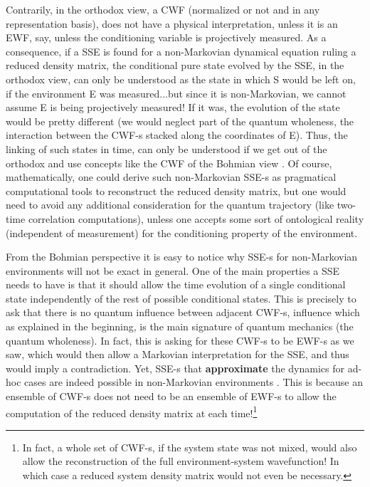 \documentclass[11pt, a4paper]{article} %
\begin{document}
Contrarily, in the orthodox view, a CWF (normalized or not and in any representation basis), does not have a physical interpretation, unless it is an EWF, say, unless the conditioning variable is projectively measured. As a consequence, if a SSE is found for a non-Markovian dynamical equation ruling a reduced density matrix, the conditional pure state evolved by the SSE, in the orthodox view, can only be understood as the state in which S would be left on, if the environment E was measured...but since it is non-Markovian, we cannot assume E is being projectively measured! If it was, the evolution of the state would be pretty different (we would neglect part of the quantum wholeness, the interaction between the CWF-s stacked along the coordinates of E). Thus, the linking of such states in time, can only be understood if we get out of the orthodox and use concepts like the CWF of the Bohmian view \cite{NMisModal, interpretSSE}. Of course, mathematically, one could derive such non-Markovian SSE-s as pragmatical computational tools to reconstruct the reduced density matrix, but one would need to avoid any additional consideration for the quantum trajectory (like two-time correlation computations), unless one accepts some sort of ontological reality (independent of measurement) for the conditioning property of the environment.

From the Bohmian perspective it is easy to notice why SSE-s for non-Markovian environments will not be exact in general. One of the main properties a SSE needs to have is that it should allow the time evolution of a single conditional state independently of the rest of possible conditional states. This is precisely to ask that there is no quantum influence between adjacent CWF-s, influence which as explained in the beginning, is the main signature of quantum mechanics (the quantum wholeness). In fact, this is asking for these CWF-s to be EWF-s as we saw, which would then allow a Markovian interpretation for the SSE, and thus would imply a contradiction. Yet, SSE-s that {\bf approximate} the dynamics for ad-hoc cases are indeed possible in non-Markovian environments \cite{ Diosi, WisemanSSE, Thz}. This is because an ensemble of CWF-s does not need to be an ensemble of EWF-s to allow the computation of the reduced density matrix at each time!\footnote{In fact, a whole set of CWF-s, if the system state was not mixed, would also allow the reconstruction of the full environment-system wavefunction! In which case a reduced system density matrix would not even be necessary.} 
\end{document}
